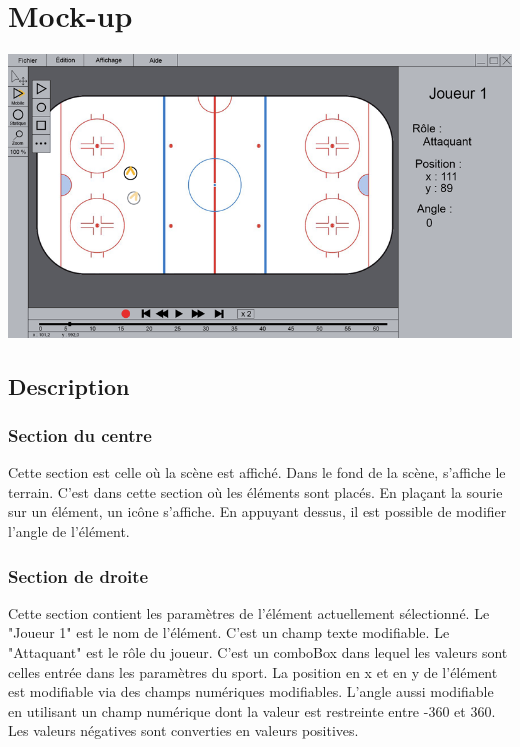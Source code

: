 \chapter{Mock-up}
\label{s:mockup}


\includegraphics[scale=0.55]{mockup/mockup.png}

\section{Description}

\subsection{Section du centre}

Cette section est celle où la scène est affiché. Dans le fond de la scène, s'affiche le terrain. C'est dans cette section où les éléments sont placés. En plaçant la sourie sur un élément, un icône s'affiche. En appuyant dessus, il est possible de modifier l'angle de l'élément.

\subsection{Section de droite}

Cette section contient les paramètres de l'élément actuellement sélectionné. Le "Joueur 1" est le nom de l'élément. C'est un champ texte modifiable. Le "Attaquant" est le rôle du joueur. C'est un comboBox dans lequel les valeurs sont celles entrée dans les paramètres du sport. La position en x et en y de l'élément est modifiable via des champs numériques modifiables. L'angle aussi modifiable en utilisant un champ numérique dont la valeur est restreinte entre -360 et 360. Les valeurs négatives sont converties en valeurs positives.


